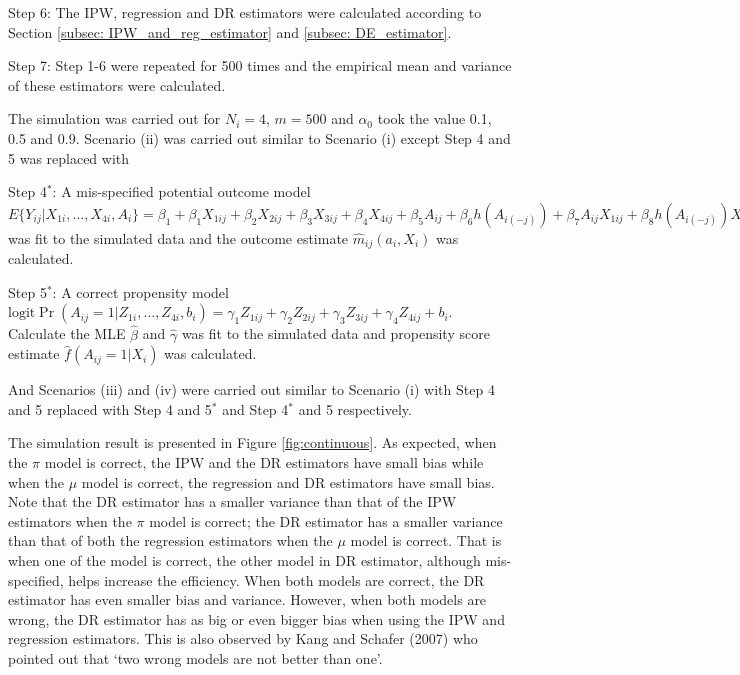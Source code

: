 \documentclass[oupdraft]{bio}
\begin{document}
\noindent \hangindent=1.5cm Step 6: The IPW, regression and DR estimators were calculated according to Section \ref{subsec: IPW_and_reg_estimator} and \ref{subsec: DE_estimator}.

\noindent \hangindent=1.5cm Step 7: Step 1-6 were repeated for 500 times and the empirical mean and variance of these estimators were calculated.

\noindent The simulation was carried out for $N_i=4$, $m=500$ and $\alpha_0$ took the value 0.1, 0.5 and 0.9. Scenario (ii) was carried out similar to Scenario (i) except Step 4 and 5 was replaced with

\noindent \hangindent=1.5cm Step 4$^{*}$: A mis-specified potential outcome model $E\{Y_{ij}|X_{1i},\ldots,X_{4i},A_i\}=\beta_1+
\beta_1X_{1ij}+\beta_2X_{2ij}+\beta_3X_{3ij}+\beta_4X_{4ij}+\beta_5A_{ij}+
\beta_6h(A_{i(-j)})+\beta_7A_{ij}X_{1ij}+\beta_8h(A_{i(-j)})X_{2ij}
$ was fit to the simulated data and the outcome estimate $\hat{m}_{ij}(a_i,X_i)$ was calculated. 

\noindent \hangindent=1.5cm Step 5$^{*}$: A correct propensity model $\mbox{logit}\Pr(A_{ij}=1|Z_{1i},\ldots,Z_{4i},b_i)=
\gamma_1Z_{1ij}+\gamma_2Z_{2ij}+\gamma_3Z_{3ij}+\gamma_4Z_{4ij}+b_i$.
 Calculate the MLE $\hat{\beta}$ and $\hat{\gamma}$ was fit to the simulated data and propensity score estimate $\hat{f}(A_{ij}=1|X_i)$ was calculated.


\noindent And Scenarios (iii) and (iv) were carried out similar to Scenario (i) with Step 4 and 5 replaced with Step 4 and 5$^{*}$ and Step 4$^{*}$ and 5 respectively. 

The simulation result is presented in Figure \ref{fig:continuous}. As expected, when the $\pi$ model is correct, the IPW and the DR estimators have small bias while when the $\mu$ model is correct, the regression and DR estimators have small bias. Note that the DR estimator has a smaller variance than that of the IPW estimators when the $\pi$ model is correct; the DR estimator has a smaller variance than that of both the regression estimators when the $\mu$ model is correct. That is when one of the model is correct, the other model in DR estimator, although mis-specified, helps increase the efficiency. When both models are correct, the DR estimator has even smaller bias and variance. However, when both models are wrong, the DR estimator has as big or even bigger bias when using the IPW and regression estimators. This is also observed by Kang and Schafer (2007)\nocite{kang2007demystifying} who pointed out that `two wrong models are not better than one'.
\end{document}
